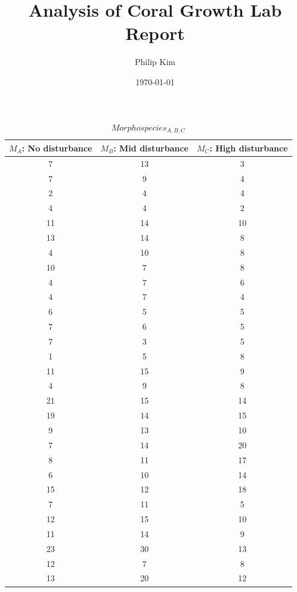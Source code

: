 \documentclass{article}
\title{Analysis of Coral Growth Lab Report}
\author{Philip Kim}
\date{\today}
\begin{document}
\maketitle

\begin{table}[h!]
  \begin{center}
    \caption{\(Morphospecies_{A,B,C}\)}\label{tab:table1}
    \begin{tabular}{|c|c|c|}\hline
      \(M_{A}\): No disturbance & \(M_{B}\): Mid disturbance & \(M_{C}\): High disturbance \\ \hline
      7 & 13 & 3 \\ \hline
      7 & 9 & 4 \\ \hline
      2 & 4 & 4 \\ \hline
      4 & 4 & 2 \\ \hline
      11 & 14 & 10 \\ \hline
      13 & 14 & 8 \\ \hline
      4 & 10 & 8 \\ \hline
      10 & 7 & 8 \\ \hline
      4 & 7 & 6 \\ \hline
      4 & 7 & 4 \\ \hline
      6 & 5 & 5 \\ \hline
      7 & 6 & 5 \\ \hline
      7 & 3 & 5 \\ \hline
      1 & 5 & 8 \\ \hline
      11 & 15 & 9 \\ \hline
      4 & 9 & 8 \\ \hline
      21 & 15 & 14 \\ \hline
      19 & 14 & 15 \\ \hline
      9 & 13 & 10 \\ \hline
      7 & 14 & 20 \\ \hline
      8 & 11 & 17 \\ \hline
      6 & 10 & 14 \\ \hline
      15 & 12 & 18 \\ \hline
      7 & 11 & 5 \\ \hline
      12 & 15 & 10 \\ \hline
      11 & 14 & 9 \\ \hline
      23 & 30 & 13 \\ \hline
      12 & 7 & 8 \\ \hline
      13 & 20 & 12 \\ \hline
    \end{tabular}

\end{center}
\end{table}
\end{document}
